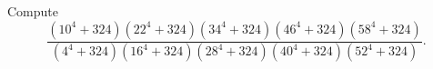 Compute
\[ \frac{(10^4+324)(22^4+324)(34^4+324)(46^4+324)(58^4+324)}{(4^4+324)(16^4+324)(28^4+324)(40^4+324)(52^4+324)}. \]